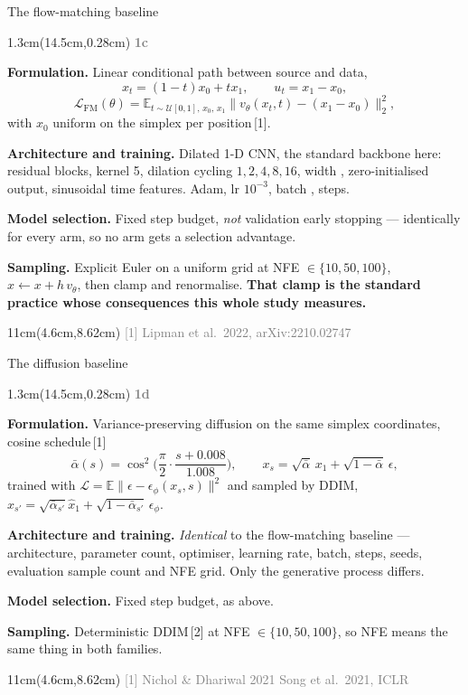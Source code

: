 \documentclass[aspectratio=169,10pt]{beamer}
\newcommand{\lab}[1]{%
  \begin{textblock*}{1.3cm}(14.5cm,0.28cm)
    \raggedleft\bfseries\small\textcolor{gray}{#1}
  \end{textblock*}}
\newcommand{\srcs}[1]{%
  \begin{textblock*}{11cm}(4.6cm,8.62cm)
    \raggedleft\fontsize{4.8}{5.6}\selectfont\textcolor{gray}{#1}
  \end{textblock*}}
\begin{document}
\begin{frame}{The flow-matching baseline}
\lab{1c}
\textbf{Formulation.} Linear conditional path between source and data,
\[
x_t = (1-t)x_0 + t x_1, \qquad u_t = x_1 - x_0,
\]
\[
\mathcal{L}_{\mathrm{FM}}(\theta) = \mathbb{E}_{t \sim \mathcal{U}[0,1],\, x_0,\, x_1}
\big\lVert v_\theta(x_t,t) - (x_1 - x_0) \big\rVert_2^2 ,
\]
with $x_0$ uniform on the simplex per position\,[1].

\medskip
\textbf{Architecture and training.} Dilated 1-D CNN, the standard backbone here: \MOneLayers{} residual
blocks, kernel 5, dilation cycling $1,2,4,8,16$, width \MOneWidth, zero-initialised output,
sinusoidal time features. Adam, lr $10^{-3}$, batch \MOneBatch, \MOneSteps{} steps.

\medskip
\textbf{Model selection.} Fixed step budget, \emph{not} validation early stopping ---
identically for every arm, so no arm gets a selection advantage.

\medskip
\textbf{Sampling.} Explicit Euler on a uniform grid at NFE $\in\{10,50,100\}$,
$x \leftarrow x + h\,v_\theta$, then clamp and renormalise. \textbf{That clamp is the standard practice whose consequences this
whole study measures.}
\srcs{[1] Lipman et al.\ 2022, arXiv:2210.02747}
\end{frame}


\begin{frame}{The diffusion baseline}
\lab{1d}
\textbf{Formulation.} Variance-preserving diffusion on the same simplex coordinates, cosine
schedule\,[1]
\[
\bar\alpha(s) = \cos^2\!\Big(\frac{\pi}{2}\cdot\frac{s + 0.008}{1.008}\Big), \qquad
x_s = \sqrt{\bar\alpha}\,x_1 + \sqrt{1-\bar\alpha}\,\epsilon ,
\]
trained with $\mathcal L=\mathbb E\lVert\epsilon-\epsilon_\phi(x_s,s)\rVert^2$ and sampled by DDIM,
$x_{s'}=\sqrt{\bar\alpha_{s'}}\hat x_1+\sqrt{1-\bar\alpha_{s'}}\,\epsilon_\phi$.

\medskip
\textbf{Architecture and training.} \emph{Identical} to the flow-matching baseline ---
architecture, parameter count, optimiser, learning rate, batch, steps, seeds, evaluation
sample count and NFE grid. Only the generative process differs.

\medskip
\textbf{Model selection.} Fixed step budget, as above.

\medskip
\textbf{Sampling.} Deterministic DDIM\,[2] at NFE $\in\{10,50,100\}$, so NFE means the same
thing in both families.
\srcs{[1] Nichol \& Dhariwal 2021 \quad [2] Song et al.\ 2021, ICLR}
\end{frame}
\end{document}
